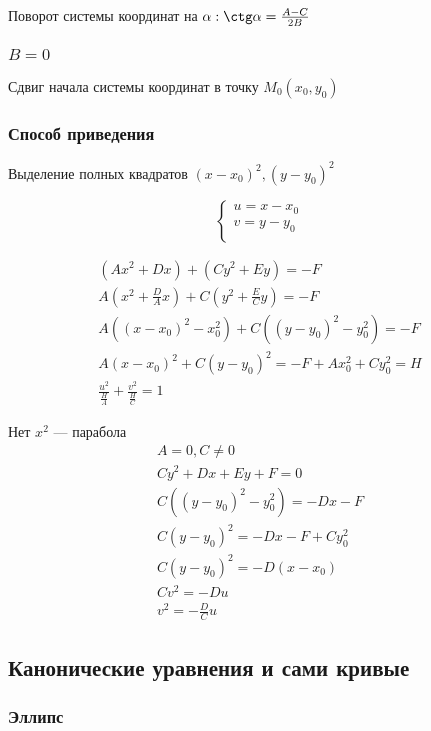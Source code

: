 \documentclass{article}
\begin{document}
Поворот системы координат на $\alpha : \ctg \alpha = \frac{A - C}{2B}$

\subsubsection{$B = 0$}

Сдвиг начала системы координат в точку $M_0(x_0, y_0)$

\subsubsection{Способ приведения}

Выделение полных квадратов $(x - x_0)^2, (y - y_0)^2$

\[
	\begin{cases}
		u = x - x_0 \\
		v = y - y_0 \\
	\end{cases}
\]

\begin{gather*}
	(Ax^2 + Dx) + (Cy^2 + Ey) = -F \\
	A(x^2 + \frac{D}{A}x) + C(y^2 + \frac{E}{C}y) = -F \\
	A((x - x_0)^2 - x_0^2) + C((y - y_0)^2 - y_0^2) = -F \\
	A(x - x_0)^2 + C(y - y_0)^2 = -F + Ax_0^2 + Cy_0^2 = H \\
	\frac{u^2}{\frac{H}{A}} + \frac{v^2}{\frac{H}{C}} = 1
\end{gather*}

Нет $x^2$ --- парабола
\begin{gather*}
	A = 0, C \ne 0 \\
	Cy^2 + Dx + Ey + F = 0 \\
	C((y - y_0)^2 - y_0^2) = -Dx - F \\
	C(y - y_0)^2 = -Dx - F + Cy_0^2 \\
	C(y - y_0)^2 = -D(x - x_0) \\
	Cv^2 = -Du \\
	v^2 = -\frac{D}{C}u
\end{gather*}

\subsection{Канонические уравнения и сами кривые}

\subsubsection{Эллипс}
\end{document}
